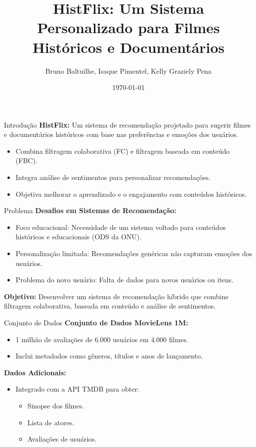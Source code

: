 \documentclass{beamer}
\title[HistFlix: Sistema de Recomendação Híbrido]{HistFlix: Um Sistema Personalizado para Filmes Históricos e Documentários}
\author{Bruno Baltuilhe, Isaque Pimentel, Kelly Graziely Pena}
\institute{Universidade Presbiteriana Mackenzie}
\date{\today}
\begin{document}
\begin{frame}
    \titlepage
\end{frame}

\begin{frame}{Introdução}
    \textbf{HistFlix:} Um sistema de recomendação projetado para sugerir filmes e documentários históricos com base nas preferências e emoções dos usuários.
    \vspace{0.5cm}
    \begin{itemize}
        \item Combina filtragem colaborativa (FC) e filtragem baseada em conteúdo (FBC).
        \item Integra análise de sentimentos para personalizar recomendações.
        \item Objetiva melhorar o aprendizado e o engajamento com conteúdos históricos.
    \end{itemize}
\end{frame}

\begin{frame}{Problema}
    \textbf{Desafios em Sistemas de Recomendação:}
    \begin{itemize}
        \item Foco educacional: Necessidade de um sistema voltado para conteúdos históricos e educacionais (ODS da ONU).
        \item Personalização limitada: Recomendações genéricas não capturam emoções dos usuários.
        \item Problema do novo usuário: Falta de dados para novos usuários ou itens.
    \end{itemize}
    \vspace{0.5cm}
    \textbf{Objetivo:} Desenvolver um sistema de recomendação híbrido que combine filtragem colaborativa, baseada em conteúdo e análise de sentimentos.
\end{frame}

\begin{frame}{Conjunto de Dados}
    \textbf{Conjunto de Dados MovieLens 1M:}
    \begin{itemize}
        \item 1 milhão de avaliações de 6.000 usuários em 4.000 filmes.
        \item Inclui metadados como gêneros, títulos e anos de lançamento.
    \end{itemize}
    \vspace{0.5cm}
    \textbf{Dados Adicionais:}
    \begin{itemize}
        \item Integrado com a API TMDB para obter:
        \begin{itemize}
            \item Sinopse dos filmes.
            \item Lista de atores.
            \item Avaliações de usuários.
        \end{itemize}
    \end{itemize}
\end{frame}
\end{document}
